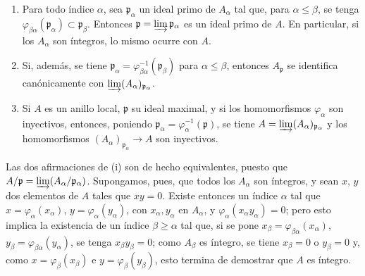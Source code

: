 \begin{proposition}[5.13.3]
\label{IV.2.s5.13.3-fr}
\begin{enumerate}
\item[\textup{(i)}] Para todo índice $\alpha$, sea $\mathfrak p_\alpha$ un ideal
primo de $A_\alpha$ tal que, para $\alpha\leq\beta$, se tenga
$\varphi_{\beta\alpha}(\mathfrak p_\alpha)\subset\mathfrak p_\beta$.
Entonces $\mathfrak p=\varinjlim\mathfrak p_\alpha$ es un ideal primo de $A$.
En particular, si los $A_\alpha$ son íntegros, lo mismo ocurre con $A$.
\item[\textup{(ii)}] Si, además, se tiene
$\mathfrak p_\alpha=\varphi_{\beta\alpha}^{-1}(\mathfrak p_\beta)$ para
$\alpha\leq\beta$, entonces $A_{\mathfrak p}$ se identifica canónicamente
con $\varinjlim(A_\alpha)_{\mathfrak p_\alpha}$.
\item[\textup{(iii)}] Si $A$ es un anillo local, $\mathfrak p$ su ideal maximal, y si
los homomorfismos $\varphi_\alpha$ son inyectivos, entonces, poniendo
$\mathfrak p_\alpha=\varphi_\alpha^{-1}(\mathfrak p)$, se tiene
$A=\varinjlim(A_\alpha)_{\mathfrak p_\alpha}$ y los homomorfismos
$(A_\alpha)_{\mathfrak p_\alpha}\to A$ son inyectivos.
\end{enumerate}
\end{proposition}

Las dos afirmaciones de (i) son de hecho equivalentes, puesto que
$A/\mathfrak p=\varinjlim(A_\alpha/\mathfrak p_\alpha)$. Supongamos, pues,
que todos los $A_\alpha$ son íntegros, y sean $x$, $y$ dos elementos de $A$
tales que $xy=0$. Existe entonces un índice $\alpha$ tal que
$x=\varphi_\alpha(x_\alpha)$, $y=\varphi_\alpha(y_\alpha)$, con
$x_\alpha,y_\alpha$ en $A_\alpha$, y
$\varphi_\alpha(x_\alpha y_\alpha)=0$; pero esto implica la existencia de un
índice $\beta\geq\alpha$ tal que, si se pone
$x_\beta=\varphi_{\beta\alpha}(x_\alpha)$,
$y_\beta=\varphi_{\beta\alpha}(y_\alpha)$, se tenga $x_\beta y_\beta=0$;
como $A_\beta$ es íntegro, se tiene $x_\beta=0$ o $y_\beta=0$ y, como
$x=\varphi_\beta(x_\beta)$ e $y=\varphi_\beta(y_\beta)$, esto termina de
demostrar que $A$ es íntegro.

